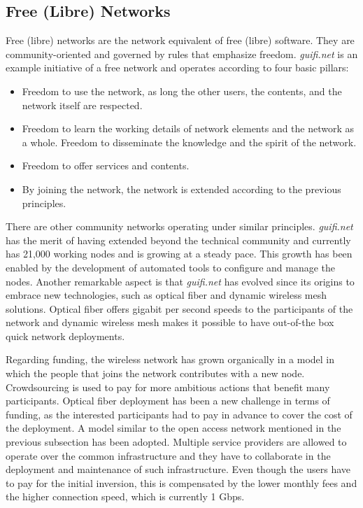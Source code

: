 \documentclass[journal]{IEEEtran}
\begin{document}
\subsection{Free (Libre) Networks}

Free (libre) networks are the network equivalent of free (libre) software.
They are community-oriented and governed by rules that emphasize freedom.
\emph{guifi.net} is an example initiative of a free network and operates according to four basic pillars:
\begin{itemize}
\item Freedom to use the network, as long the other users, the contents, and the network itself are respected.
\item Freedom to learn the working details of network elements and the network as a whole. Freedom to disseminate the knowledge and the spirit of the network.
\item Freedom to offer services and contents.
\item By joining the network, the network is extended according to the previous principles.
\end{itemize}

There are other community networks operating under similar principles.
\emph{guifi.net} has the merit of having extended beyond the technical community and currently has 21,000 working nodes and is growing at a steady pace.
This growth has been enabled by the development of automated tools to configure and manage the nodes.
Another remarkable aspect is that \emph{guifi.net} has evolved since its origins to embrace new technologies, such as optical fiber and dynamic wireless mesh solutions.
Optical fiber offers gigabit per second speeds to the participants of the network and dynamic wireless mesh makes it possible to have out-of-the box quick network deployments.

Regarding funding, the wireless network has grown organically in a model in which the people that joins the network contributes with a new node.
Crowdsourcing is used to pay for more ambitious actions that benefit many participants.
Optical fiber deployment has been a new challenge in terms of funding, as the interested participants had to pay in advance to cover the cost of the deployment.
A model similar to the open access network mentioned in the previous subsection has been adopted.
Multiple service providers are allowed to operate over the common infrastructure and they have to collaborate in the deployment and maintenance of such infrastructure.
Even though the users have to pay for the initial inversion, this is compensated by the lower monthly fees and the higher connection speed, which is currently 1 Gbps.
\end{document}
